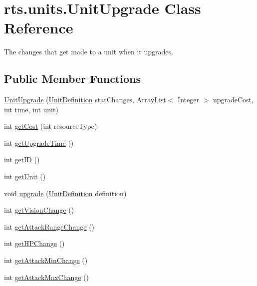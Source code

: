 \hypertarget{classrts_1_1units_1_1_unit_upgrade}{
\section{rts.units.UnitUpgrade Class Reference}
\label{classrts_1_1units_1_1_unit_upgrade}
}


The changes that get made to a unit when it upgrades.  


\subsection*{Public Member Functions}
\begin{DoxyCompactItemize}
\item 
\hyperlink{classrts_1_1units_1_1_unit_upgrade_a06cde01b0bc0c259b954a908df145287}{UnitUpgrade} (\hyperlink{classrts_1_1units_1_1_unit_definition}{UnitDefinition} statChanges, ArrayList$<$ Integer $>$ upgradeCost, int time, int unit)
\item 
int \hyperlink{classrts_1_1units_1_1_unit_upgrade_a384b59060918478b3b98c307e169fb10}{getCost} (int resourceType)
\item 
int \hyperlink{classrts_1_1units_1_1_unit_upgrade_a32e01f69d967604f3b8f73b7f0172ff4}{getUpgradeTime} ()
\item 
int \hyperlink{classrts_1_1units_1_1_unit_upgrade_aa10cd127e38c6f57924110d9d74265d4}{getID} ()
\item 
int \hyperlink{classrts_1_1units_1_1_unit_upgrade_a656805f67076c047cf694487b4db6632}{getUnit} ()
\item 
void \hyperlink{classrts_1_1units_1_1_unit_upgrade_af5a73825c4f76bb185a641d595666520}{upgrade} (\hyperlink{classrts_1_1units_1_1_unit_definition}{UnitDefinition} definition)
\item 
int \hyperlink{classrts_1_1units_1_1_unit_upgrade_ad5a95e7ad7586696fade4ab59062926e}{getVisionChange} ()
\item 
int \hyperlink{classrts_1_1units_1_1_unit_upgrade_a6574d5bdbe6fec974f822b844a59c846}{getAttackRangeChange} ()
\item 
int \hyperlink{classrts_1_1units_1_1_unit_upgrade_a58160758d0fcf6352d2d5ff81e8fc69e}{getHPChange} ()
\item 
int \hyperlink{classrts_1_1units_1_1_unit_upgrade_ad34a8d398e91b89c01a6c2fea566f679}{getAttackMinChange} ()
\item 
int \hyperlink{classrts_1_1units_1_1_unit_upgrade_ade8da1b7fbd4fd2f7456ed7a566a6aaa}{getAttackMaxChange} ()

\end{DoxyCompactItemize}
